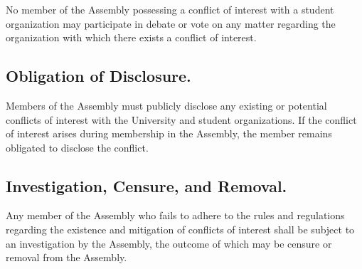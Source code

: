 \documentclass{rules}
\begin{document}
\subsubsection{}
No member of the Assembly possessing a conflict of interest with a student organization may participate in debate or vote on any matter regarding the organization with which there exists a conflict of interest.
\subsection{Obligation of Disclosure.}
Members of the Assembly must publicly disclose any existing or potential conflicts of interest with the University and student organizations.  If the conflict of interest arises during membership in the Assembly, the member remains obligated to disclose the conflict.
\subsection{Investigation, Censure, and Removal.}
Any member of the Assembly who fails to adhere to the rules and regulations regarding the existence and mitigation of conflicts of interest shall be subject to an investigation by the Assembly, the outcome of which may be censure or removal from the Assembly.
\end{document}
